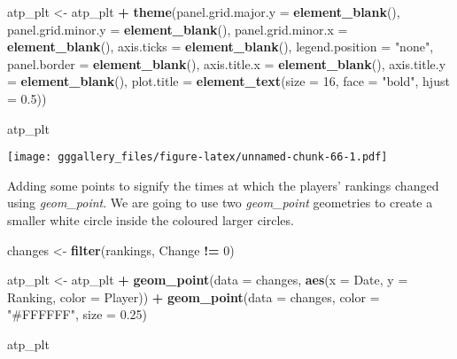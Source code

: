 \documentclass[]{book}
\newenvironment{Shaded}{\begin{snugshade}}{\end{snugshade}}
\newcommand{\DataTypeTok}[1]{\textcolor[rgb]{0.13,0.29,0.53}{#1}}
\newcommand{\DecValTok}[1]{\textcolor[rgb]{0.00,0.00,0.81}{#1}}
\newcommand{\FloatTok}[1]{\textcolor[rgb]{0.00,0.00,0.81}{#1}}
\newcommand{\KeywordTok}[1]{\textcolor[rgb]{0.13,0.29,0.53}{\textbf{#1}}}
\newcommand{\NormalTok}[1]{#1}
\newcommand{\OperatorTok}[1]{\textcolor[rgb]{0.81,0.36,0.00}{\textbf{#1}}}
\newcommand{\StringTok}[1]{\textcolor[rgb]{0.31,0.60,0.02}{#1}}
\begin{document}
\begin{Shaded}
\begin{Highlighting}[]
\NormalTok{atp_plt <-}\StringTok{ }\NormalTok{atp_plt }\OperatorTok{+}\StringTok{ }
\StringTok{  }\KeywordTok{theme}\NormalTok{(}\DataTypeTok{panel.grid.major.y =} \KeywordTok{element_blank}\NormalTok{(), }\DataTypeTok{panel.grid.minor.y =} \KeywordTok{element_blank}\NormalTok{(),}
        \DataTypeTok{panel.grid.minor.x =} \KeywordTok{element_blank}\NormalTok{(), }\DataTypeTok{axis.ticks =} \KeywordTok{element_blank}\NormalTok{(), }
        \DataTypeTok{legend.position =} \StringTok{"none"}\NormalTok{, }\DataTypeTok{panel.border =} \KeywordTok{element_blank}\NormalTok{(),}
        \DataTypeTok{axis.title.x =} \KeywordTok{element_blank}\NormalTok{(), }\DataTypeTok{axis.title.y =} \KeywordTok{element_blank}\NormalTok{(),}
        \DataTypeTok{plot.title =} \KeywordTok{element_text}\NormalTok{(}\DataTypeTok{size =} \DecValTok{16}\NormalTok{, }\DataTypeTok{face =} \StringTok{"bold"}\NormalTok{, }\DataTypeTok{hjust =} \FloatTok{0.5}\NormalTok{)) }

\NormalTok{atp_plt}
\end{Highlighting}
\end{Shaded}

\texttt{[image: gggallery\_files/figure-latex/unnamed-chunk-66-1.pdf]}

Adding some points to signify the times at which the players' rankings changed using \emph{geom\_point}.
We are going to use two \emph{geom\_point} geometries to create a smaller white circle inside the coloured larger circles.

\begin{Shaded}
\begin{Highlighting}[]
\NormalTok{changes <-}\StringTok{ }\KeywordTok{filter}\NormalTok{(rankings, Change }\OperatorTok{!=}\StringTok{ }\DecValTok{0}\NormalTok{)}


\NormalTok{atp_plt <-}\StringTok{ }\NormalTok{atp_plt }\OperatorTok{+}\StringTok{ }\KeywordTok{geom_point}\NormalTok{(}\DataTypeTok{data =}\NormalTok{ changes, }\KeywordTok{aes}\NormalTok{(}\DataTypeTok{x =}\NormalTok{ Date, }\DataTypeTok{y =}\NormalTok{ Ranking, }\DataTypeTok{color =}\NormalTok{ Player)) }\OperatorTok{+}
\StringTok{  }\KeywordTok{geom_point}\NormalTok{(}\DataTypeTok{data =}\NormalTok{ changes, }\DataTypeTok{color =} \StringTok{"#FFFFFF"}\NormalTok{, }\DataTypeTok{size =} \FloatTok{0.25}\NormalTok{) }

\NormalTok{atp_plt}
\end{Highlighting}
\end{Shaded}
\end{document}
